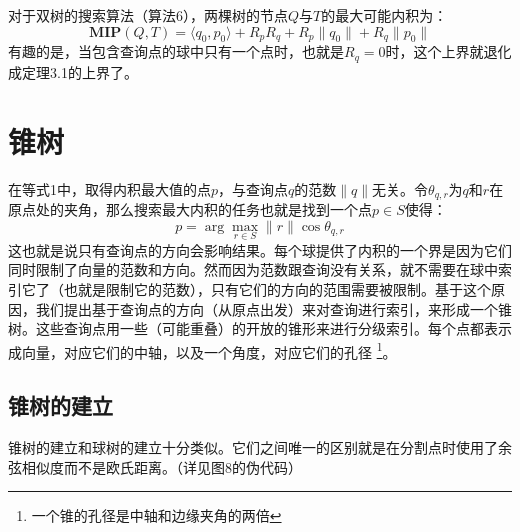 \documentclass[twocolumn,a4paper]{article}
\begin{document}
对于双树的搜索算法（算法6），两棵树的节点$Q$与$T$的最大可能内积为：
\begin{equation*}
\mathbf{MIP}(Q,T)=\langle q_0,p_0 \rangle + R_p R_q + R_p\|q_0\| + R_q\|p_0\|
\end{equation*}
有趣的是，当包含查询点的球中只有一个点时，也就是$R_q = 0$时，这个上界就退化成定理3.1的上界了。

\section{锥树}
在等式1中，取得内积最大值的点$p$，与查询点$q$的范数$\|q\|$无关。令$\theta_{q,r}$为$q$和$r$在原点处的夹角，那么搜索最大内积的任务也就是找到一个点$p \in S$使得：
\begin{equation}
p = \arg \max_{r \in S}\|r\|\cos\theta_{q,r}
\end{equation}
这也就是说只有查询点的方向会影响结果。每个球提供了内积的一个界是因为它们同时限制了向量的范数和方向。然而因为范数跟查询没有关系，就不需要在球中索引它了（也就是限制它的范数），只有它们的方向的范围需要被限制。基于这个原因，我们提出基于查询点的方向（从原点出发）来对查询进行索引，来形成一个锥树。这些查询点用一些（可能重叠）的开放的锥形来进行分级索引。每个点都表示成向量，对应它们的中轴，以及一个角度，对应它们的孔径
\footnote{一个锥的孔径是中轴和边缘夹角的两倍}。
\subsection{锥树的建立}
锥树的建立和球树的建立十分类似。它们之间唯一的区别就是在分割点时使用了余弦相似度而不是欧氏距离。（详见图8的伪代码）
\end{document}

